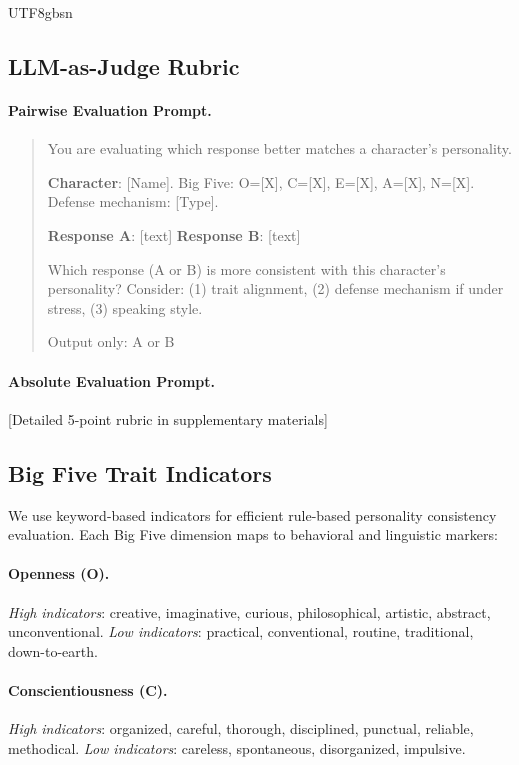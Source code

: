 \documentclass[11pt]{article}
\begin{document}
\begin{CJK*}{UTF8}{gbsn}
\subsection{LLM-as-Judge Rubric}
\label{sec:rubric}

\paragraph{Pairwise Evaluation Prompt.}
\begin{quote}
\small
You are evaluating which response better matches a character's personality.

\textbf{Character}: [Name]. Big Five: O=[X], C=[X], E=[X], A=[X], N=[X]. Defense mechanism: [Type].

\textbf{Response A}: [text]
\textbf{Response B}: [text]

Which response (A or B) is more consistent with this character's personality? Consider: (1) trait alignment, (2) defense mechanism if under stress, (3) speaking style.

Output only: A or B
\end{quote}

\paragraph{Absolute Evaluation Prompt.}
[Detailed 5-point rubric in supplementary materials]

\subsection{Big Five Trait Indicators}
\label{sec:indicators}

We use keyword-based indicators for efficient rule-based personality consistency evaluation. Each Big Five dimension maps to behavioral and linguistic markers:

\paragraph{Openness (O).} \textit{High indicators}: creative, imaginative, curious, philosophical, artistic, abstract, unconventional. \textit{Low indicators}: practical, conventional, routine, traditional, down-to-earth.

\paragraph{Conscientiousness (C).} \textit{High indicators}: organized, careful, thorough, disciplined, punctual, reliable, methodical. \textit{Low indicators}: careless, spontaneous, disorganized, impulsive.


\end{CJK*}
\end{document}
